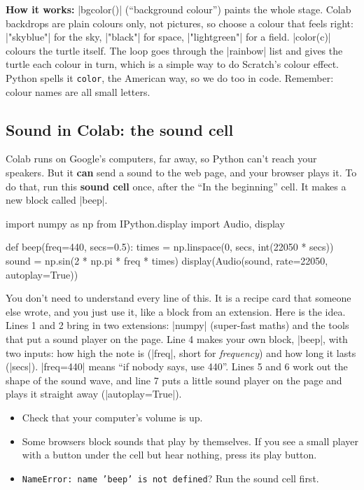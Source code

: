 \textbf{How it works:} \py|bgcolor()| (``background colour'') paints the whole stage. Colab backdrops are plain colours only, not pictures, so choose a colour that feels right: \py|"skyblue"| for the sky, \py|"black"| for space, \py|"lightgreen"| for a field. \py|color(c)| colours the turtle itself. The loop goes through the \py|rainbow| list and gives the turtle each colour in turn, which is a simple way to do Scratch's colour effect. Python spells it \texttt{color}, the American way, so we do too in code. Remember: colour names are all small letters.

\subsection*{Sound in Colab: the sound cell}

Colab runs on Google's computers, far away, so Python can't reach your speakers. But it \textbf{can} send a sound to the web page, and your browser plays it. To do that, run this \textbf{sound cell} once, after the ``In the beginning'' cell. It makes a new block called \py|beep|.

\begin{typethis}
import numpy as np
from IPython.display import Audio, display

def beep(freq=440, secs=0.5):
    times = np.linspace(0, secs, int(22050 * secs))
    sound = np.sin(2 * np.pi * freq * times)
    display(Audio(sound, rate=22050, autoplay=True))
\end{typethis}

You don't need to understand every line of this. It is a recipe card that someone else wrote, and you just use it, like a block from an extension. Here is the idea. Lines 1 and 2 bring in two extensions: \py|numpy| (super-fast maths) and the tools that put a sound player on the page. Line 4 makes your own block, \py|beep|, with two inputs: how high the note is (\py|freq|, short for \emph{frequency}) and how long it lasts (\py|secs|). \py|freq=440| means ``if nobody says, use 440''. Lines 5 and 6 work out the shape of the sound wave, and line 7 puts a little sound player on the page and plays it straight away (\py|autoplay=True|).

\begin{watchout}[No sound?]
\begin{itemize}
  \item Check that your computer's volume is up.
  \item Some browsers block sounds that play by themselves. If you see a small player with a \playbtn{} button under the cell but hear nothing, press its play button.
  \item \texttt{NameError: name 'beep' is not defined}? Run the sound cell first.
\end{itemize}
\end{watchout}

